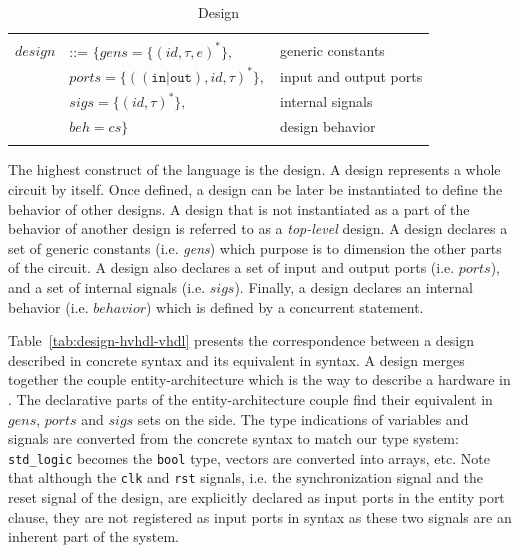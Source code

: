 \documentclass[pdflatex,sn-mathphys]{sn-jnl}%
\theoremstyle{thmstyleone}%
\theoremstyle{thmstyletwo}%
\theoremstyle{thmstylethree}%
\begin{document}
\begin{table}[!htbp]
  \caption{Design}
  \label{tab:design}
  \begin{tabular}{|rll|}
    \hline
    & & \\
    $design$ & ::= $\{{}gens=\{(id,\tau,e)^{*}\},$ & generic constants \\
    & \quad\quad${}ports=\{((\mathtt{in}\vert\mathtt{out}),id,\tau)^{*}\},$ & input and output ports \\
    & \quad\quad${}sigs=\{(id,\tau)^{*}\},$ & internal signals \\
    & \quad\quad${}beh=cs\}$ & design behavior \\
    & & \\
    \hline
  \end{tabular}
\end{table}

The highest construct of the \hvhdl{} language is the design. A design
represents a whole circuit by itself. Once defined, a design can be
later be instantiated to define the behavior of other designs. A
design that is not instantiated as a part of the behavior of another
design is referred to as a \textit{top-level} design. A design
declares a set of generic constants (i.e. \textit{gens}) which purpose
is to dimension the other parts of the circuit. A design also declares
a set of input and output ports (i.e. $ports$), and a set of internal
signals (i.e. $sigs$). Finally, a design declares an internal behavior
(i.e. $behavior$) which is defined by a concurrent statement.

Table~\ref{tab:design-hvhdl-vhdl} presents the correspondence between
a design described in concrete \vhdl{} syntax and its equivalent in
\hvhdl{} syntax. A \hvhdl{} design merges together the couple
entity-architecture which is the way to describe a hardware in
\vhdl{}. The declarative parts of the entity-architecture couple find
their equivalent in $gens$, $ports$ and $sigs$ sets on the \hvhdl{}
side. The type indications of variables and signals are converted from
the concrete syntax to match our type system: \texttt{std\_logic}
becomes the \texttt{bool} type, vectors are converted into arrays,
etc. Note that although the \texttt{clk} and \texttt{rst} signals,
i.e. the synchronization signal and the reset signal of the design,
are explicitly declared as input ports in the entity port clause, they
are not registered as input ports in \hvhdl{} syntax as these two
signals are an inherent part of the system.
\end{document}
